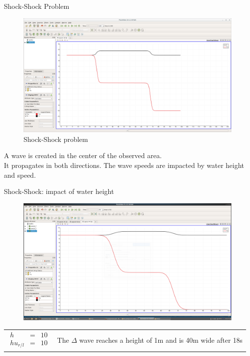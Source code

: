 \documentclass[shortpres]{beamer}
\newcommand{\imgvoffset}{-20pt}
\newcommand{\imgfullscale}{0.75}
\begin{document}
\begin{frame}{Shock-Shock Problem}
	\begin{figure}[t]
		\vspace{\imgvoffset}
		\includegraphics[clip, width=\imgfullscale\linewidth]{img/Shock-Shock.png}
		\caption*{Shock-Shock problem}
	\end{figure}
	\centering
	A wave is created in the center of the observed area.\\
	It propagates in both directions. The wave speeds are impacted by water height and speed.
\end{frame}


\begin{frame}{Shock-Shock: impact of water height}
	\begin{figure}[t]
		\vspace{\imgvoffset}
		\includegraphics[width=\imgfullscale\linewidth]{img/Shock_h10_t18.png}
		\caption*{}
	\end{figure}
	
	\begin{tabular}{m{3cm} m{\linewidth-5cm}}
		$
		\begin{matrix}
		h & = & 10\\
		hu_{r/l} & = & 10
		\end{matrix}
		$
		&
		
		The $\Delta$ wave reaches a height of 1m and is 40m wide after 18s
	\end{tabular}
\end{frame}
\end{document}
